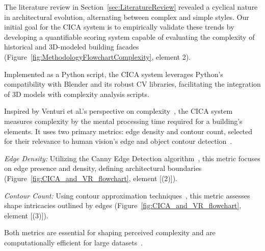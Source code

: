 
The literature review in Section~\ref{sec:LiteratureReview} revealed a cyclical nature in architectural evolution, alternating between complex and simple styles.
Our initial goal for the CICA system is to empirically validate these trends by developing a quantifiable scoring system capable of evaluating the complexity of historical and 3D-modeled building facades (Figure~\ref{fig:MethodologyFlowchartComplexity}, element 2).

Implemented as a Python script, the CICA system leverages Python's compatibility with Blender and its robust CV libraries, facilitating the integration of 3D models with complexity analysis scripts.

Inspired by Venturi et al.'s perspective on complexity~\cite{Venturi1977}, the CICA system measures complexity by the mental processing time required for a building's elements.
It uses two primary metrics: edge density and contour count, selected for their relevance to human vision's edge and object contour detection~\cite{Yang2022}.

\textit{Edge Density:} Utilizing the Canny Edge Detection algorithm~\cite{EdgeOpenCV2023}, this metric focuses on edge presence and density, defining architectural boundaries (Figure~\ref{fig:CICA_and_VR_flowchart}, element [(2)]).

\textit{Contour Count:} Using contour approximation techniques~\cite{ContourOpenCV2023}, this metric assesses shape intricacies outlined by edges (Figure~\ref{fig:CICA_and_VR_flowchart}, element [(3)]).

Both metrics are essential for shaping perceived complexity and are computationally efficient for large datasets~\cite{Yang2022}.



